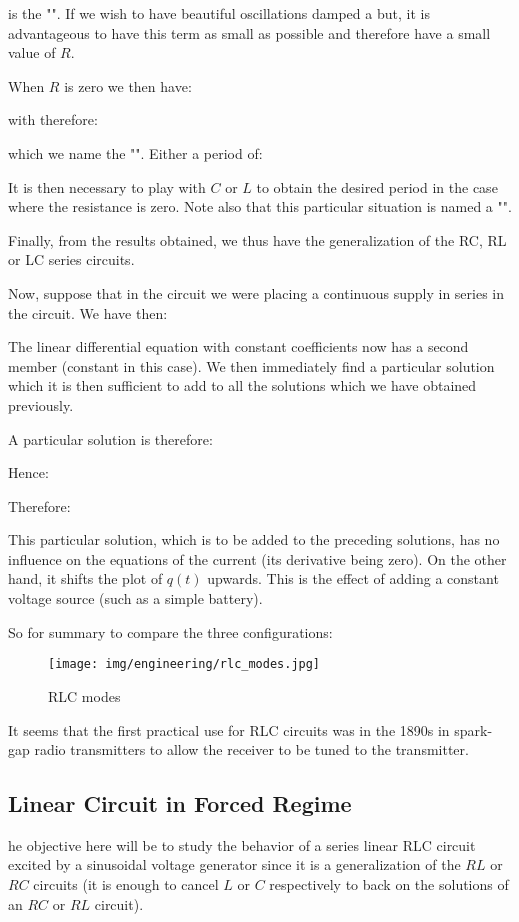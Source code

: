 	is the "". If we wish to have beautiful oscillations damped a but, it is advantageous to have this term as small as possible and therefore have a small value of $R$.

	When $R$ is zero we then have:
	
	with therefore:
	
	which we name the "". Either a period of:
	
	It is then necessary to play with $C$ or $L$ to obtain the desired period in the case where the resistance is zero. Note also that this particular situation is named a "".

	Finally, from the results obtained, we thus have the generalization of the RC, RL or LC series circuits.

	Now, suppose that in the circuit we were placing a continuous supply in series in the circuit. We have then:
	
	The linear differential equation with constant coefficients now has a second member (constant in this case). We then immediately find a particular solution which it is then sufficient to add to all the solutions which we have obtained previously.

	A particular solution is therefore:
	
	Hence:
	
	Therefore:
	
	This particular solution, which is to be added to the preceding solutions, has no influence on the equations of the current (its derivative being zero). On the other hand, it shifts the plot of $q(t)$ upwards. This is the effect of adding a constant voltage source (such as a simple battery).
	
	So for summary to compare the three configurations:
	 \begin{figure}[H]
		\centering
		\texttt{[image: img/engineering/rlc\_modes.jpg]}
		\caption[]{RLC modes}
	\end{figure}
	\begin{tcolorbox}[title=Remark,colframe=black,arc=10pt]
	It seems that the first practical use for RLC circuits was in the 1890s in spark-gap radio transmitters to allow the receiver to be tuned to the transmitter.
	\end{tcolorbox}
	
	\pagebreak
	\subsection{Linear Circuit in Forced Regime}
	he objective here will be to study the behavior of a series linear RLC circuit excited by a sinusoidal voltage generator since it is a generalization of the $RL$ or $RC$ circuits  (it is enough to cancel $L$ or $C$ respectively to back on the solutions of an $RC$ or $RL$ circuit).

